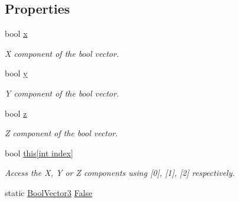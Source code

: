 \subsection*{Properties}
\begin{DoxyCompactItemize}
\item 
bool \hyperlink{class_grid_framework_1_1_vectors_1_1_bool_vector3_af3ebd5b8aaa17bac774786a155d32e8f_af3ebd5b8aaa17bac774786a155d32e8f}{x}
\begin{DoxyCompactList}\small\item\em X component of the bool vector.\end{DoxyCompactList}\item 
bool \hyperlink{class_grid_framework_1_1_vectors_1_1_bool_vector3_ae48d3b107b2d350b68fac8bf8d7f7b0d_ae48d3b107b2d350b68fac8bf8d7f7b0d}{y}
\begin{DoxyCompactList}\small\item\em Y component of the bool vector.\end{DoxyCompactList}\item 
bool \hyperlink{class_grid_framework_1_1_vectors_1_1_bool_vector3_adab045b6c2bfbd95c9d899a245a958ea_adab045b6c2bfbd95c9d899a245a958ea}{z}
\begin{DoxyCompactList}\small\item\em Z component of the bool vector.\end{DoxyCompactList}\item 
bool \hyperlink{class_grid_framework_1_1_vectors_1_1_bool_vector3_afefc01ade5cf181c20e030306439f660_afefc01ade5cf181c20e030306439f660}{this\mbox{[}int index\mbox{]}}
\begin{DoxyCompactList}\small\item\em Access the X, Y or Z components using \mbox{[}0\mbox{]}, \mbox{[}1\mbox{]}, \mbox{[}2\mbox{]} respectively.\end{DoxyCompactList}\item 
static \hyperlink{class_grid_framework_1_1_vectors_1_1_bool_vector3}{Bool\+Vector3} \hyperlink{class_grid_framework_1_1_vectors_1_1_bool_vector3_ab4be6dcbe12c4ec6100b254e1d9bcd40_ab4be6dcbe12c4ec6100b254e1d9bcd40}{False}

\end{DoxyCompactItemize}
